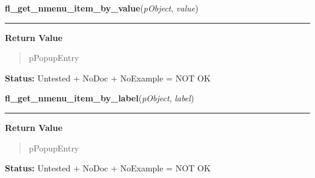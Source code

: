     \label{xformslib:library:fl_get_nmenu_item_by_value}

    \vspace{0.5ex}

\hspace{.8\funcindent}\begin{boxedminipage}{\funcwidth}

    \raggedright \textbf{fl\_get\_nmenu\_item\_by\_value}(\textit{pObject}, \textit{value})

    \vspace{-1.5ex}

    \rule{\textwidth}{0.5\fboxrule}
\setlength{\parskip}{2ex}
\setlength{\parskip}{1ex}
      \textbf{Return Value}
    \vspace{-1ex}

      \begin{quote}
      pPopupEntry

      \end{quote}

\textbf{Status:} Untested + NoDoc + NoExample = NOT OK



    \end{boxedminipage}

    \label{xformslib:library:fl_get_nmenu_item_by_label}

    \vspace{0.5ex}

\hspace{.8\funcindent}\begin{boxedminipage}{\funcwidth}

    \raggedright \textbf{fl\_get\_nmenu\_item\_by\_label}(\textit{pObject}, \textit{label})

    \vspace{-1.5ex}

    \rule{\textwidth}{0.5\fboxrule}
\setlength{\parskip}{2ex}
\setlength{\parskip}{1ex}
      \textbf{Return Value}
    \vspace{-1ex}

      \begin{quote}
      pPopupEntry

      \end{quote}

\textbf{Status:} Untested + NoDoc + NoExample = NOT OK



    \end{boxedminipage}

